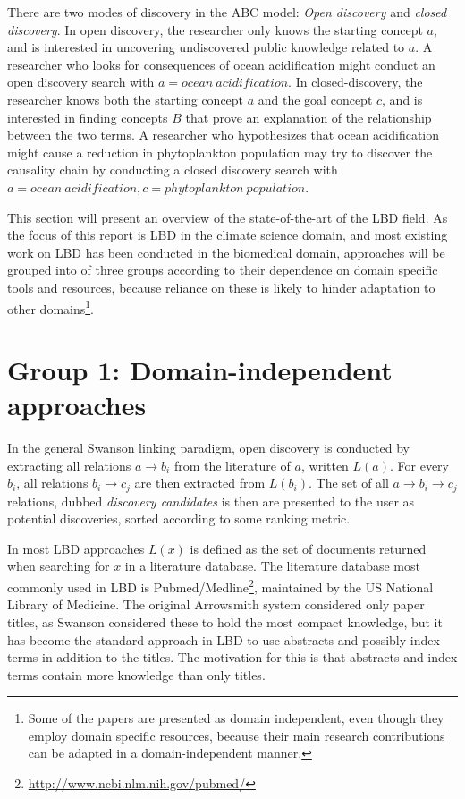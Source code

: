 There are two modes of discovery in the ABC model: \emph{Open discovery} and \emph{closed discovery}. In open discovery, the researcher only knows the starting concept $a$, and is interested in uncovering undiscovered public knowledge related to $a$. A researcher who looks for consequences of ocean acidification might conduct an open discovery search with $a=ocean\ acidification$. In closed-discovery, the researcher knows both the starting concept $a$ and the goal concept $c$, and is interested in finding concepts $B$ that prove an explanation of the relationship between the two terms. A researcher who hypothesizes that ocean acidification might cause a reduction in phytoplankton population may try to discover the causality chain by conducting a closed discovery search with $a=ocean\ acidification,c=phytoplankton\ population$.

This section will present an overview of the state-of-the-art of the LBD field. As the focus of this report is LBD in the climate science domain, and most existing work on LBD has been conducted in the biomedical domain, approaches will be grouped into of three groups according to their dependence on domain specific tools and resources, because reliance on these is likely to hinder adaptation to other domains\footnote{Some of the papers are presented as domain independent, even though they employ domain specific resources, because their main research contributions can be adapted in a domain-independent manner.}.

\section{Group 1: Domain-independent approaches}

In the general Swanson linking paradigm, open discovery is conducted by extracting all relations $a \to b_i$ from the literature of $a$, written $L(a)$. For every $b_i$, all relations $b_i \to c_j$ are then extracted from $L(b_i)$. The set of all $a \to b_i \to c_j$ relations, dubbed \emph{discovery candidates} is then are presented to the user as potential discoveries, sorted according to some ranking metric.

In most LBD approaches $L(x)$ is defined as the set of documents returned when searching for $x$ in a literature database. The literature database most commonly used in LBD is Pubmed/Medline\footnote{\url{http://www.ncbi.nlm.nih.gov/pubmed/}}, maintained by the US National Library of Medicine. The original Arrowsmith system considered only paper titles, as Swanson considered these to hold the most compact knowledge, but it has become the standard approach in LBD to use abstracts and possibly index terms in addition to the titles. The motivation for this is that abstracts and index terms contain more knowledge than only titles. 


